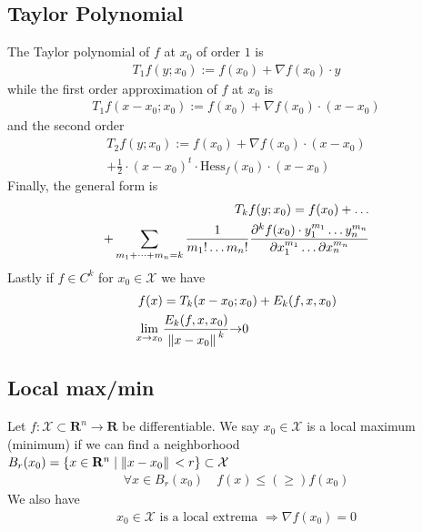 \documentclass[8pt]{extarticle}
\newcommand{\R}{{\mathbb R}}
\newcommand{\X}{{\mathcal X}}
\newcommand{\ra}{{\rightarrow}}
\newcommand{\Ra}{{\Rightarrow}}
\def\R{\mathbf{R}}
\begin{document}
\begin{multicols*}{3}
  \subsection{Taylor Polynomial}
  The Taylor polynomial of $f$ at $x_0$
  of order $1$ is
  \begin{align*}
    T_1 f(y; x_0) := f(x_0) + \nabla f(x_0) \cdot y
  \end{align*}
  while the first order approximation of
  $f$ at $x_0$ is
  \begin{align*}
    T_1 f(x - x_0; x_0) := f(x_0) + \nabla f(x_0) \cdot (x - x_0)
  \end{align*}
  and the second order
  \begin{align*}
    T_2 f(y; x_0) := f(x_0) + \nabla f(x_0) \cdot (x - x_0) \\
    + \frac{1}{2} \cdot (x - x_0)^t \cdot \text{Hess}_f(x_0) \cdot (x - x_0)
  \end{align*}
  Finally, the general form is
  \begin{align*}
    T_k f(y; x_0) = f(x_0) + \dots \\
    + \sum_{m_1 + \dots + m_n = k} \frac{1}{m_1! \dots m_n!} \pdv{^k f(x_0) \cdot y_1^{m_1} \dots y_n^{m_n}}{x_1^{m_1} \dots \partial x_n^{m_n}}
  \end{align*}
  Lastly if $f \in C^k$ for $x_0 \in \X$ we have
  \begin{align*}
    f(x)             & = T_k(x - x_0; x_0) + E_k(f, x, x_0)           \\
    \lim_{x \ra x_0} & \frac{E_k(f, x, x_0)}{\norm*{x - x_0}^k} \ra 0
  \end{align*}
  \subsection{Local max/min}
  Let $f: \X \subset \R^n \ra \R$ be differentiable. We say $x_0 \in \X$
  is a local maximum (minimum) if we can find a neighborhood
  $B_r(x_0) = \{ x \in \R^n\;|\; \norm*{x - x_0} < r \} \subset \X$
  \begin{align*}
    \forall x \in B_r(x_0) \quad f(x) \leq (\geq) f(x_0)
  \end{align*}
  We also have
  \begin{align*}
    x_0 \in \X \text{ is a local extrema } \Ra \nabla f(x_0) = 0
  \end{align*}

\end{multicols*}
\end{document}
